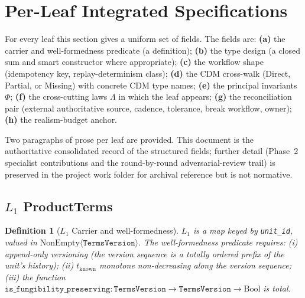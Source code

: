 \documentclass[11pt,a4paper]{article}
\newtheorem{definition}{Definition}[section]
\begin{document}
\clearpage
\section{Per-Leaf Integrated Specifications}
\label{sec:per-leaf}

For every leaf this section gives a uniform set of fields. The fields are: \textbf{(a)} the carrier and well-formedness predicate (a definition); \textbf{(b)} the type design (a closed sum and smart constructor where appropriate); \textbf{(c)} the workflow shape (idempotency key, replay-determinism class); \textbf{(d)} the CDM cross-walk (Direct, Partial, or Missing) with concrete CDM type names; \textbf{(e)} the principal invariants $\Phi$; \textbf{(f)} the cross-cutting laws $\Lambda$ in which the leaf appears; \textbf{(g)} the reconciliation pair (external authoritative source, cadence, tolerance, break workflow, owner); \textbf{(h)} the realism-budget anchor.

Two paragraphs of prose per leaf are provided. This document is the authoritative consolidated record of the structured fields; further detail (Phase~2 specialist contributions and the round-by-round adversarial-review trail) is preserved in the project work folder for archival reference but is not normative.

\subsection{$L_1$ ProductTerms}
\label{sec:leaf-l1}

\begin{definition}[$L_1$ Carrier and well-formedness]
$L_1$ is a map keyed by \texttt{unit\_id}, valued in $\mathrm{NonEmpty}\langle\texttt{TermsVersion}\rangle$. The well-formedness predicate requires: (i) append-only versioning (the version sequence is a totally ordered prefix of the unit's history); (ii) $t_{\mathrm{known}}$ monotone non-decreasing along the version sequence; (iii) the function $\texttt{is\_fungibility\_preserving}: \texttt{TermsVersion} \to \texttt{TermsVersion} \to \mathrm{Bool}$ is total.
\end{definition}
\end{document}
